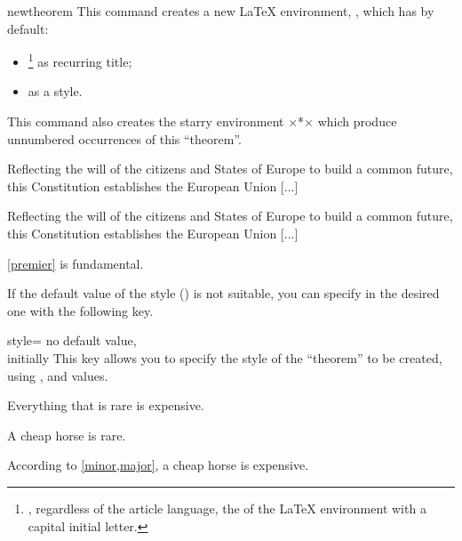 \documentclass[english,nolocaltoc]{nwejmart}
\newtheorem{article}
\newtheorem[style=definition]{fact}
\newtheorem[title-plural=Criteria]{criterion}
\newtheorem[title=random experiment]{rexp}
\begin{document}
\begin{docCommand}{newtheorem}{}
  This command creates a new \LaTeX{} environment, , which
  has by default:
  \begin{itemize}
  \item {}\footnote{\Ie*{}, regardless of the article
      language,  the  of the \LaTeX{} environment with a
      capital initial letter.}  as recurring title;
  \item {} as a style.
  \end{itemize}
  This command also creates the starry environment  ×*×
  which produce unnumbered occurrences of this \enquote{theorem}.

\begin{bodycode}[listing and text,listing options={deletekeywords={[2]article,label}}]
\begin{article*}
  Reflecting the will of the citizens and States of Europe to build a
  common future, this Constitution establishes the European Union  [...]
\end{article*}
\begin{article}\label{premier}
  Reflecting the will of the citizens and States of Europe to build a
  common future, this Constitution establishes the European Union  [...]
\end{article}
\vref{premier} is fundamental.
\end{bodycode}

  If the  default value of the style () is not
  suitable, you can specify in  the desired one with
  the following   key.
  \begin{docKey}{style}{=\textbar{}\textbar{}}{
      no default value,\\initially {}}
    This key allows you to specify the style of the \enquote{theorem}
    to be created, using ,  and
     values.
  \end{docKey}
\begin{bodycode}[listing and text,listing options={deletekeywords={[2]label}}]
\begin{fact}\label{major}
  Everything that is rare is expensive.
\end{fact}
\begin{fact}\label{minor}
  A cheap horse is rare.
\end{fact}
According to  \cref{minor,major},  a cheap horse is expensive.
\end{bodycode}


\end{docCommand}
\end{document}
